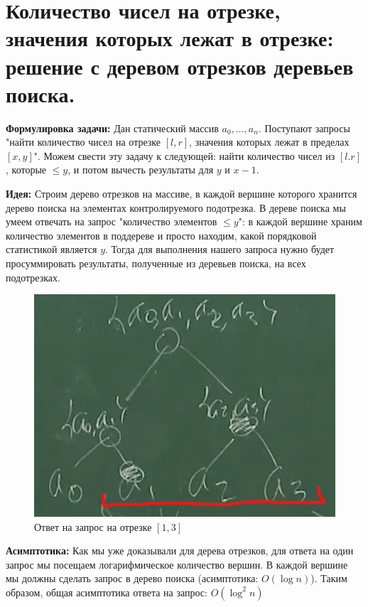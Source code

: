 \setcounter{section}{62}
\section{Количество чисел на отрезке, значения которых лежат в отрезке: решение с деревом отрезков деревьев поиска.}
\par \textbf{Формулировка задачи:} Дан статический массив $a_0, \ldots, a_n$. Поступают запросы "найти количество чисел на отрезке $[l,r]$, значения которых лежат в пределах $[x,y]$". Можем свести эту задачу к следующей: найти количество чисел из $[l.r]$, которые $\leqslant y$, и потом вычесть результаты для $y$ и $x-1$.
\par \textbf{Идея:} Строим дерево отрезков на массиве, в каждой вершине которого хранится дерево поиска на элементах контролируемого подотрезка. В дереве поиска мы умеем отвечать на запрос "количество элементов $\leqslant y$": в каждой вершине храним количество элементов в поддереве и просто находим, какой порядковой статистикой является $y$. Тогда для выполнения нашего запроса нужно будет просуммировать результаты, полученные из деревьев поиска, на всех подотрезках.
\begin{figure}[h]
    \centering
    \includegraphics[scale=0.8]{images/63-64_dodd}
    \caption{Ответ на запрос на отрезке $[1,3]$}
\end{figure}
\par \textbf{Асимптотика:} Как мы уже доказывали для дерева отрезков, для ответа на один запрос мы посещаем логарифмическое количество вершин. В каждой вершине мы должны сделать запрос в дерево поиска (асимптотика: $O(\log n)$). Таким образом, общая асимптотика ответа на запрос: $O(\log^2 n)$
\\
\\
\\
\\
\\
\\
\\
\\
\\
\\
\\
\setcounter{section}{63}
